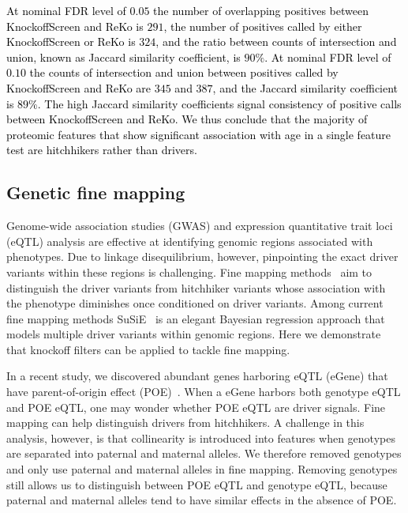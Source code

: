 \documentclass[12pt,Times]{article}
\def\cite{\citep}
\def\tcb{\textcolor{black}}
\begin{document}
\tcb{At nominal FDR level of $0.05$ the number of overlapping positives between KnockoffScreen and ReKo is $291$, the number of positives called by either KnockoffScreen or ReKo is $324$, and the ratio between counts of intersection and union, known as Jaccard similarity coefficient,  is $90\%$. 
At nominal FDR level of $0.10$ the counts of intersection and union between positives called by KnockoffScreen and ReKo are $345$ and $387$, and the Jaccard similarity coefficient is $89\%$.  The high Jaccard similarity coefficients signal consistency of positive calls between KnockoffScreen and ReKo. We thus conclude that the majority of proteomic features that show significant association with age in a single feature test are hitchhikers rather than drivers.  
}

\subsection{Genetic fine mapping}
Genome-wide association studies (GWAS) and expression quantitative trait loci (eQTL) analysis are effective at identifying genomic regions associated with phenotypes.  Due to linkage disequilibrium, however, pinpointing the exact driver variants within these regions is challenging. Fine mapping methods~\cite{caviar,finemap,susie} aim to distinguish the driver variants from hitchhiker variants whose association with the phenotype diminishes once conditioned on driver variants. Among current fine mapping methods SuSiE~\cite{susie} is an elegant Bayesian regression approach  that models multiple driver variants within genomic regions. 
Here we demonstrate that knockoff filters can be applied to tackle fine mapping. 


In a recent study, we discovered abundant genes harboring eQTL (eGene) that have parent-of-origin effect (POE)~\cite{poe}. 
When a eGene harbors both genotype eQTL and POE eQTL, one may wonder whether POE eQTL are driver signals. Fine mapping can help distinguish drivers from hitchhikers. A challenge in this analysis, however, is that collinearity is introduced into features when genotypes are separated into paternal and maternal alleles.  We therefore removed genotypes and only use paternal and maternal alleles in fine mapping. Removing genotypes still allows us to distinguish between POE eQTL and genotype eQTL, because paternal and maternal alleles tend to have similar effects in the absence of POE.  
\end{document}
